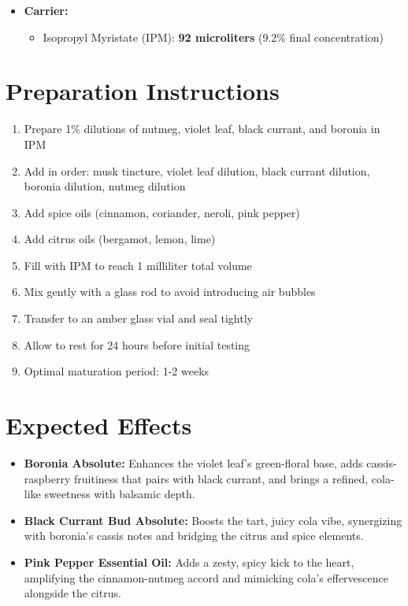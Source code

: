 \documentclass{article}
\begin{document}
\begin{itemize}[leftmargin=*]
  \item \textcolor{pepperRed}{\textbf{Carrier:}}
  \begin{itemize}
    \item Isopropyl Myristate (IPM): \textbf{92 microliters} (9.2\% final concentration)
  \end{itemize}
\end{itemize}

\section*{Preparation Instructions}
\begin{enumerate}
  \item Prepare 1\% dilutions of nutmeg, violet leaf, black currant, and boronia in IPM
  \item Add in order: musk tincture, violet leaf dilution, black currant dilution, boronia dilution, nutmeg dilution
  \item Add spice oils (cinnamon, coriander, neroli, pink pepper)
  \item Add citrus oils (bergamot, lemon, lime)
  \item Fill with IPM to reach 1 milliliter total volume
  \item Mix gently with a glass rod to avoid introducing air bubbles
  \item Transfer to an amber glass vial and seal tightly
  \item Allow to rest for 24 hours before initial testing
  \item Optimal maturation period: 1-2 weeks
\end{enumerate}

\section*{Expected Effects}
\begin{itemize}
  \item \textcolor{boroniaViolet}{\textbf{Boronia Absolute:}} Enhances the violet leaf's green-floral base, adds cassis-raspberry fruitiness that pairs with black currant, and brings a refined, cola-like sweetness with balsamic depth.
  
  \item \textcolor{boroniaViolet}{\textbf{Black Currant Bud Absolute:}} Boosts the tart, juicy cola vibe, synergizing with boronia's cassis notes and bridging the citrus and spice elements.
  
  \item \textcolor{boroniaViolet}{\textbf{Pink Pepper Essential Oil:}} Adds a zesty, spicy kick to the heart, amplifying the cinnamon-nutmeg accord and mimicking cola's effervescence alongside the citrus.
\end{itemize}
\end{document}
